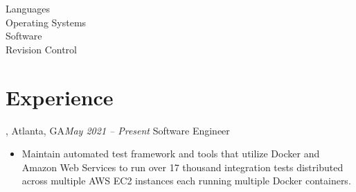 \documentclass{article}
\makeatletter
\newcommand{\entry}[1]{\def\@entry{#1}}
\newcommand{\dates}[1]{\def\@dates{#1}}
\newcommand{\location}[1]{\def\@location{#1}}
\newenvironment{locationentry}
	{\noindent{\bf \@entry}, \@location\hfill{\it\@dates\linebreak\/}}
	{\vspace{0.5em}\hspace{1em}}
\makeatother
\begin{document}
\begin{description}
	\item[Languages]
	\item[Operating Systems]
	\item[Software]
	\item[Revision Control]
\end{description}

\section{Experience}

\entry{Alvaria}
\location{Atlanta, GA}
\dates{May 2021 -- Present}
\begin{locationentry}
	Software Engineer
	\begin{itemize}
		\item Maintain automated test framework and tools that utilize
			Docker and Amazon Web Services to run over 17 thousand
			integration tests distributed across multiple AWS EC2
			instances each running multiple Docker containers.
	\end{itemize}
\end{locationentry}
\end{document}

